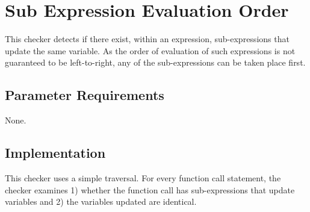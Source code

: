 %
%

\section{Sub Expression Evaluation Order}
\label{SubExpressionEvaluationOrder::overview}

This checker detects if there exist, within an expression, sub-expressions that update the same variable.
As the order of evaluation of such expressions is not guaranteed to be left-to-right, any of the sub-expressions can be taken place first.

\subsection{Parameter Requirements}

None.

\subsection{Implementation}

This checker uses a simple traversal. For every function call statement, the checker examines 1) whether the function call has sub-expressions that update variables and 2) the variables updated are identical.

